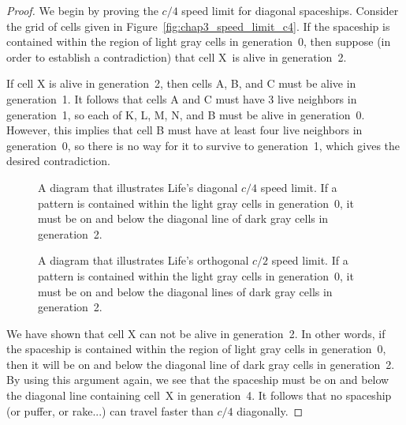 \begin{proof}
	We begin by proving the $c/4$ speed limit for diagonal spaceships. Consider the grid of cells given in Figure~\ref{fig:chap3_speed_limit_c4}. If the spaceship is contained within the region of light gray cells in generation~0, then suppose (in order to establish a contradiction) that cell X~is alive in generation~2.
	
	If cell X is alive in generation~2, then cells A, B, and C must be alive in generation~1. It follows that cells A and C must have 3 live neighbors in generation~1, so each of K, L, M, N, and B must be alive in generation~0. However, this implies that cell B must have at least four live neighbors in generation~0, so there is no way for it to survive to generation~1, which gives the desired contradiction.
	
	\begin{figure}[!htb]
		\centering
		\begin{minipage}{.47\textwidth}
			\centering{}
			
			\caption{A diagram that illustrates Life's diagonal $c/4$ speed limit. If a pattern is contained within the light gray cells in generation~0, it must be on and below the diagonal line of dark gray cells in generation~2.}\label{fig:chap3_speed_limit_c4}
		\end{minipage} \quad %
		\begin{minipage}{.48\textwidth}
			\centering{}
			\caption{A diagram that illustrates Life's orthogonal $c/2$ speed limit. If a pattern is contained within the light gray cells in generation~0, it must be on and below the diagonal lines of dark gray cells in generation~2.}\label{fig:chap3_speed_limit_c2}
		\end{minipage}
	\end{figure}
	
	We have shown that cell X can not be alive in generation~2. In other words, if the spaceship is contained within the region of light gray cells in generation~0, then it will be on and below the diagonal line of dark gray cells in generation~2. By using this argument again, we see that the spaceship must be on and below the diagonal line containing cell~X in generation~4. It follows that no spaceship (or puffer, or rake...) can travel faster than $c/4$ diagonally.
	

\end{proof}
